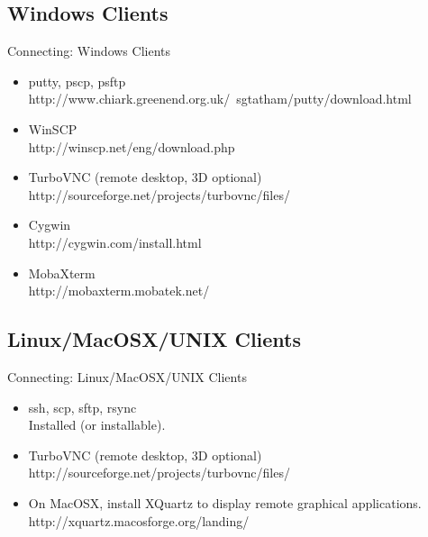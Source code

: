 \subsection{Windows Clients}
\begin{frame}{Connecting: Windows Clients}
\begin{itemize}
\item<1-5> putty, pscp, psftp\hfill\\
\alert{\small http://www.chiark.greenend.org.uk/~sgtatham/putty/download.html}
\item<2-5> WinSCP\hfill\\
\alert{\small http://winscp.net/eng/download.php}
\item<3-5> TurboVNC \alert{\small (remote desktop, 3D optional)}\hfill\\
\alert{\small http://sourceforge.net/projects/turbovnc/files/}
\item<4-5> Cygwin \hfill\\
\alert{\small http://cygwin.com/install.html}\hfill\\
\item<6> MobaXterm\hfill\\
\alert{\small http://mobaxterm.mobatek.net/}
\end{itemize}
\end{frame}

\subsection{Linux/MacOSX/UNIX Clients}
\begin{frame}{Connecting: Linux/MacOSX/UNIX Clients}
\begin{itemize}
\item {\color<2->{red}ssh}, scp, sftp, {rsync}\hfill\\
\alert{\small Installed (or installable).}
\item<3-> TurboVNC \alert{\small (remote desktop, 3D optional)}\hfill\\
\alert{\small http://sourceforge.net/projects/turbovnc/files/}
\item<4-> On MacOSX, install \alert{XQuartz} to display remote graphical applications.\hfill\\
\alert{\small http://xquartz.macosforge.org/landing/}
\end{itemize}
\end{frame}

